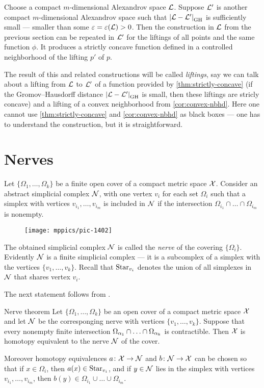 Choose a compact $m$-dimensional Alexandrov space $\mathcal{L}$.
Suppose $\mathcal{L}'$ is another compact $m$-dimensional Alexandrov space such that $\dist{\spc{L}}{\spc{L}'}{\GH}$ is sufficiently small --- smaller than some $\varepsilon=\varepsilon(\mathcal{L})>0$.
Then the construction in $\mathcal{L}$ from the previous section  
can be repeated in $\mathcal{L}'$ for the liftings of all points and the same function $\phi$.
It produces a strictly concave function defined in a controlled neighborhood of the lifting $p'$ of $p$.

The result of this and related constructions will be called \emph{liftings},
say we can talk about a lifting from $\mathcal{L}$ to $\mathcal{L}'$ of a function provided by \ref{thm:strictly-concave} (if the Gromov--Hausdorff distance $\dist{\spc{L}}{\spc{L}'}{\GH}$ is small, then these liftings are stricly concave)
and a lifting of a convex neighborhood from \ref{cor:convex-nbhd}.
Here one cannot use \ref{thm:strictly-concave} and \ref{cor:convex-nbhd} as black boxes --- one has to understand the construction, but it is straightforward.

\section{Nerves}

Let $\{\Omega_1,\dots,\Omega_k\}$ be a finite open cover of a compact metric space $\mathcal{X}$.
Consider an abstract simplicial complex $\mathcal{N}$, with one vertex $v_i$ for each set $\Omega_i$ such that a simplex with vertices $v_{i_1},\dots, v_{i_m}$ is included in $\mathcal{N}$ if 
the intersection $\Omega_{i_1}\cap\dots\cap \Omega_{i_m}$ is nonempty.
\begin{figure}[ht!]
\vskip-0mm
\centering
\texttt{[image: mppics/pic-1402]}
\end{figure}
The obtained simplicial complex $\mathcal{N}$ is called the \emph{nerve} of the covering $\{\Omega_i\}$.
Evidently $\mathcal{N}$ is a finite simplicial complex ---
it is a subcomplex of a simplex with the vertices $\{v_1,\dots,v_k\}$.
Recall that $\mathop{\rm Star}\nolimits_{v_i}$ denotes the union of all simplexes in $\mathcal{N}$ that shares vertex $v_i$.

The next statement follows from \cite[4G.3]{hatcher}.


\begin{thm}{Nerve theorem}
Let $\{\Omega_1,\dots,\Omega_k\}$ be an open cover of a compact metric space $\mathcal{X}$
and let $\mathcal{N}$ be the corresponging nerve with vertices $\{v_1,\dots,v_k\}$.
Suppose that every nonempty finite intersection $\Omega_{\alpha_1}\cap\z\dots\cap\Omega_{\alpha_k}$ is contractible.
Then $\mathcal{X}$ is homotopy equivalent to the nerve $\mathcal{N}$ of the cover.

Moreover homotopy equivalences  $a\colon\mathcal{X}\to \mathcal{N}$ and $b\colon\mathcal{N}\to\mathcal{X}$ can be chosen so that 
if $x\in \Omega_i$, then $a(x)\in \mathop{\rm Star}\nolimits_{v_i}$,
and if $y\in\mathcal{N}$ lies in the simplex with vertices $v_{i_1},\dots, v_{i_m}$, then $b(y)\in \Omega_{i_1}\cup\dots\cup \Omega_{i_m}$.
\end{thm}

